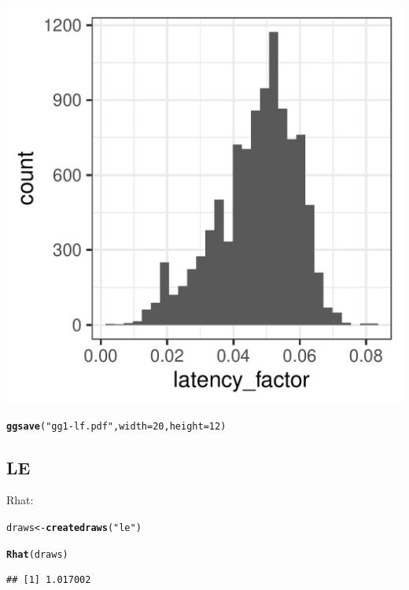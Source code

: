 \documentclass{article}\usepackage[]{graphicx}\usepackage[]{color}
\makeatletter
\def\maxwidth{ %
  \ifdim\Gin@nat@width>\linewidth
    \linewidth
  \else
    \Gin@nat@width
  \fi
}
\newcommand{\hlnum}[1]{\textcolor[rgb]{0.686,0.059,0.569}{#1}}%
\newcommand{\hlstr}[1]{\textcolor[rgb]{0.192,0.494,0.8}{#1}}%
\newcommand{\hlstd}[1]{\textcolor[rgb]{0.345,0.345,0.345}{#1}}%
\newcommand{\hlkwb}[1]{\textcolor[rgb]{0.69,0.353,0.396}{#1}}%
\newcommand{\hlkwc}[1]{\textcolor[rgb]{0.333,0.667,0.333}{#1}}%
\newcommand{\hlkwd}[1]{\textcolor[rgb]{0.737,0.353,0.396}{\textbf{#1}}}%
\newenvironment{kframe}{%
 \def\at@end@of@kframe{}%
 \ifinner\ifhmode%
  \def\at@end@of@kframe{\end{minipage}}%
  \begin{minipage}{\columnwidth}%
 \fi\fi%
 \def\FrameCommand##1{\hskip\@totalleftmargin \hskip-\fboxsep
 \colorbox{shadecolor}{##1}\hskip-\fboxsep
     \hskip-\linewidth \hskip-\@totalleftmargin \hskip\columnwidth}%
 \MakeFramed {\advance\hsize-\width
   \@totalleftmargin\z@ \linewidth\hsize
   \@setminipage}}%
 {\par\unskip\endMakeFramed%
 \at@end@of@kframe}
\newenvironment{knitrout}{}{} %
\makeatother
\begin{document}
\begin{knitrout}
\begin{kframe}
{\ttfamily\noindent\itshape\color{messagecolor}{\#\# `stat\_bin()` using `bins = 30`. Pick better value with `binwidth`.}}\end{kframe}
\includegraphics[width=\maxwidth]{figures/figure7regionsunnamed-chunk-13-1} 
\begin{kframe}\begin{alltt}
\hlkwd{ggsave}\hlstd{(}\hlstr{"gg1-lf.pdf"}\hlstd{,} \hlkwc{width} \hlstd{=} \hlnum{20}\hlstd{,} \hlkwc{height} \hlstd{=} \hlnum{12}\hlstd{)}
\end{alltt}


{\ttfamily\noindent\itshape\color{messagecolor}{\#\# `stat\_bin()` using `bins = 30`. Pick better value with `binwidth`.}}\end{kframe}
\end{knitrout}

\subsection{LE}

Rhat:
\begin{knitrout}
\color{fgcolor}\begin{kframe}
\begin{alltt}
\hlstd{draws} \hlkwb{<-} \hlkwd{createdraws}\hlstd{(}\hlstr{"le"}\hlstd{)}

\hlkwd{Rhat}\hlstd{(draws)}
\end{alltt}
\begin{verbatim}
## [1] 1.017002
\end{verbatim}
\end{kframe}
\end{knitrout}
\end{document}
